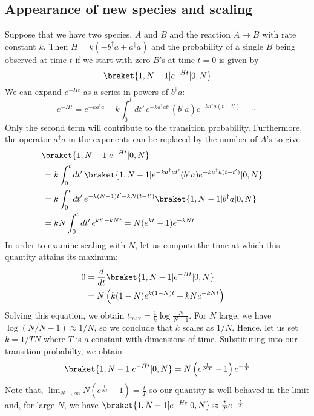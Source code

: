 \subsection{Appearance of new species and scaling}

Suppose that we have two species, $A$ and $B$ and the reaction $A \to B$ with rate constant $k$.  Then $H = k (-b^\dagger a + a^\dagger a)$ and the probability of a single $B$ being observed at time $t$ if we start with zero $B$'s at time $t=0$ is given by
\[
 \braket{1, N-1 | e^{-Ht} | 0, N}
\]
We can expand $e^{-Ht}$ as a series in powers of $b^\dagger a$:
\[
 e^{-Ht} = e^{-k a^\dagger a} +
   k \int_0^t dt'\, e^{-k a^\dagger a t'} (b^\dagger a) e^{-k a^\dagger a (t - t')}
   + \cdots
\]
Only the second term will contribute to the transition probability.  Furthermore, the operator $a^\dagger a$ in the exponents can be replaced by the number of $A$'s to give
\begin{align*}
 &\!\braket{1, N-1 | e^{-Ht} | 0, N} \cr &=
 k \int_0^t dt'\,\braket{1, N-1 | e^{-k a^\dagger a t'} (b^\dagger a) e^{-k a^\dagger a (t - t')} | 0, N} \cr &=
 k \int_0^t dt'\, e^{-k (N-1) t' - k N (t - t')} \braket{1, N-1 | b^\dagger a | 0, N} \cr &=
 kN \int_0^t dt'\, e^{kt' - kNt} = N (e^{kt} - 1) e^{-kNt}
\end{align*}
In order to examine scaling with $N$, let us compute the time at which this quantity attains its maximum:
\begin{align*}
 0 &= \frac{d}{dt} \braket{1, N-1 | e^{-Ht} | 0, N} \cr &=
 N \left( k (1-N) e^{k (1-N) t} + kN e^{-kNt} \right)
 \end{align*}
 Solving this equation, we obtain $t_\mathrm{max} = \frac{1}{k} \log \frac{N}{N-1}$.  For $N$ large, we have $\log(N/N-1) \approx 1/N$, so we conclude that $k$ scales as $1/N$.  Hence, let us set $k = 1/TN$ where $T$ is a constant with dimensions of time.  Substituting into our transition probabilty, we obtain
 \begin{align*}
 \braket{1, N-1 | e^{-Ht} | 0, N} =
 N \left( e^\frac{t}{NT} - 1 \right) e^{-\frac{t}{T}}
 \end{align*}
 Note that, $\lim_{N \to \infty} N \left( e^\frac{t}{NT} - 1 \right) = \frac{t}{T}$  so our quantity is well-behaved in the limit and, for large $N$, we have $\braket{1, N-1 | e^{-Ht} | 0, N} \approx \frac{t}{T} e^{-\frac{t}{T}}$.

